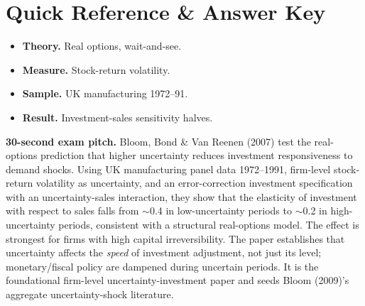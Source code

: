 \documentclass[11pt]{article}
\begin{document}
\section*{Quick Reference \& Answer Key}
\begin{answerbox}
\begin{itemize}
\item \textbf{Theory.} Real options, wait-and-see.
\item \textbf{Measure.} Stock-return volatility.
\item \textbf{Sample.} UK manufacturing 1972--91.
\item \textbf{Result.} Investment-sales sensitivity halves.
\end{itemize}
\end{answerbox}

\begin{keybox}
\textbf{30-second exam pitch.} Bloom, Bond \& Van Reenen (2007) test the real-options prediction that higher uncertainty reduces investment responsiveness to demand shocks. Using UK manufacturing panel data 1972--1991, firm-level stock-return volatility as uncertainty, and an error-correction investment specification with an uncertainty-sales interaction, they show that the elasticity of investment with respect to sales falls from $\sim$0.4 in low-uncertainty periods to $\sim$0.2 in high-uncertainty periods, consistent with a structural real-options model. The effect is strongest for firms with high capital irreversibility. The paper establishes that uncertainty affects the \emph{speed} of investment adjustment, not just its level; monetary/fiscal policy are dampened during uncertain periods. It is the foundational firm-level uncertainty-investment paper and seeds Bloom (2009)'s aggregate uncertainty-shock literature.
\end{keybox}
\end{document}
